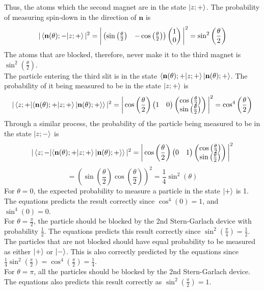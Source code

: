 \begin{sol}
\begin{enumerate}[label=\textbf{(\alph*)}]
    Thus, the atoms which the second magnet are in the state $\ket{z;+}$. The probability of measuring spin-down in the direction of $\mathbf{n}$ is 
    $$|\braket{\mathbf{n}(\theta);-}{z;+}|^2=\bigg|\begin{pmatrix}\sin\left(\frac{\theta}{2}\right)&-\cos\left(\frac{\theta}{2}\right)\end{pmatrix}\begin{pmatrix}1\\0\end{pmatrix}\bigg|^2=\sin^2\left(\frac{\theta}{2}\right)$$
    The atoms that are blocked, therefore, never make it to the third magnet is $\sin^2(\frac{\theta}{2})$.\\
    The particle entering the third slit is in the state $\braket{\mathbf{n}(\theta);+}{z;+}\ket{\mathbf{n}(\theta);+}$. The probability of it being measured to be in the state $\ket{z;+}$ is
    $$|\braket{z;+}{\braket{\mathbf{n}(\theta);+}{z;+}\ket{\mathbf{n}(\theta);+}}|^2=\bigg|\cos\left(\frac{\theta}{2}\right)\begin{pmatrix}1&0\end{pmatrix}\begin{pmatrix}\cos\left(\frac{\theta}{2}\right)\\\sin\left(\frac{\theta}{2}\right)\end{pmatrix}\bigg|^2=\cos^4\left(\frac{\theta}{2}\right)$$
    Through a similar process, the probability of the particle being measured to be in the state $\ket{z;-}$ is
    $$|\braket{z;-}{\braket{\mathbf{n}(\theta);+}{z;+}\ket{\mathbf{n}(\theta);+}}|^2=\bigg|\cos\left(\frac{\theta}{2}\right)\begin{pmatrix}0&1\end{pmatrix}\begin{pmatrix}\cos\left(\frac{\theta}{2}\right)\\\sin\left(\frac{\theta}{2}\right)\end{pmatrix}\bigg|^2$$
    $$=\left(\sin\left(\frac{\theta}{2}\right)\cos\left(\frac{\theta}{2}\right)\right)^2=\frac{1}{4}\sin^2(\theta)$$
    For $\theta=0$, the expected probability to measure a particle in the state $\ket +$ is 1. The equations predicts the result correctly since $\cos^4(0)=1$, and $\sin^4(0)=0$.\\
    For $\theta=\frac{\pi}{2}$, the particle should be blocked by the 2nd Stern-Garlach device with probability $\frac{1}{2}$. The equations predicts this result correctly since $\sin^2(\frac{\pi}{4})=\frac{1}{2}$. The particles that are not blocked should have equal probability to be measured as either $\ket+$ or $\ket-$. This is also correctly predicted by the equations since $\frac{1}{4}\sin^2(\frac{\pi}{2})=\cos^4(\frac{\pi}{2})=\frac{1}{4}$.\\
    For $\theta=\pi$, all the particles should be blocked by the 2nd Stern-Garlach device. The equations also predicts this result correctly as $\sin^2(\frac{\pi}{2})=1$.
    \end{enumerate}
    \end{sol}